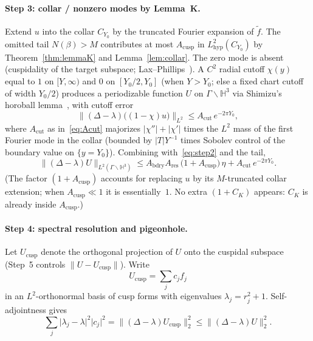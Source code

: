 \documentclass[11pt]{amsart}
\theoremstyle{definition}
\newcommand{\HH}{\mathbb{H}^3}
\newcommand{\abs}[1]{\lvert#1\rvert}
\newcommand{\norm}[1]{\lVert#1\rVert}
\begin{document}
\paragraph{Step 3: collar / nonzero modes by Lemma~K.}
Extend $u$ into the collar $C_{Y_0}$ by the truncated Fourier expansion of
$\widetilde f$.  The omitted tail $N(\beta)>M$ contributes at most
$A_{\mathrm{cusp}}$ in $L^2_{\mathrm{hyp}}(C_{Y_0})$ by
Theorem~\ref{thm:lemmaK} and Lemma~\ref{lem:collar}.  The zero mode is
absent (cuspidality of the target subspace; Lax--Phillips~\cite{LP}).
A $C^2$ radial cutoff $\chi(y)$ equal to $1$ on $[Y,\infty)$ and $0$ on
$[Y_0/2,Y_0]$ (when $Y>Y_0$; else a fixed chart cutoff of width $Y_0/2$)
produces a periodizable function $U$ on $\Gamma\backslash\HH$ via
Shimizu's horoball lemma~\cite{Shimizu,Leutbecher}, with cutoff error
\begin{equation}
\label{eq:step3a}
  \norm{(\Delta-\lambda)\bigl((1-\chi)u\bigr)}_{L^2}
  \le
  A_{\mathrm{cut}}\,e^{-2\pi Y_0},
  \tag{3a}
\end{equation}
where $A_{\mathrm{cut}}$ as in~\eqref{eq:Acut} majorizes
$\abs{\chi''}+\abs{\chi'}$ times the $L^2$ mass of the first Fourier mode
in the collar (bounded by $\abs{T}Y^{-1}$ times Sobolev control of the
boundary value on $\{y=Y_0\}$).  Combining with~\eqref{eq:step2} and the
tail,
\begin{equation}
\label{eq:step3}
  \norm{(\Delta-\lambda)U}_{L^2(\Gamma\backslash\HH)}
  \le
  A_{\mathrm{bdry}}A_{\mathrm{res}}\,
  \bigl(1+A_{\mathrm{cusp}}\bigr)\,
  \eta
  +
  A_{\mathrm{cut}}\,e^{-2\pi Y_0}.
  \tag{3}
\end{equation}
(The factor $(1+A_{\mathrm{cusp}})$ accounts for replacing $u$ by its
$M$-truncated collar extension; when $A_{\mathrm{cusp}}\ll 1$ it is
essentially~$1$.  No extra $(1+C_K)$ appears: $C_K$ is already inside
$A_{\mathrm{cusp}}$.)

\paragraph{Step 4: spectral resolution and pigeonhole.}
Let $U_{\mathrm{cusp}}$ denote the orthogonal projection of $U$ onto the
cuspidal subspace (Step~5 controls $\norm{U-U_{\mathrm{cusp}}}$).  Write
\[
  U_{\mathrm{cusp}}
  =
  \sum_j c_j f_j
\]
in an $L^2$-orthonormal basis of cusp forms with eigenvalues
$\lambda_j=r_j^2+1$.  Self-adjointness gives
\begin{equation}
\label{eq:step4a}
  \sum_j \abs{\lambda_j-\lambda}^2\abs{c_j}^2
  =
  \norm{(\Delta-\lambda)U_{\mathrm{cusp}}}_2^2
  \le
  \norm{(\Delta-\lambda)U}_2^2.
  \tag{4a}
\end{equation}
\end{document}
